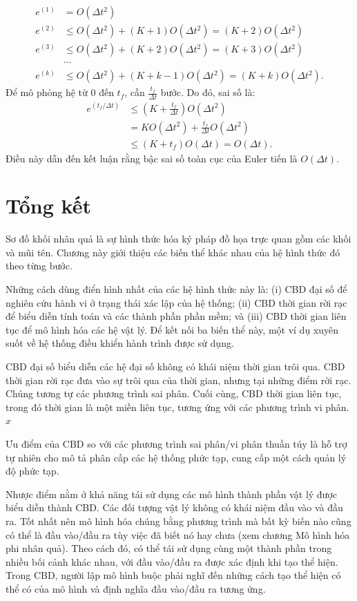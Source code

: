 \[\begin{aligned}
e^{(1)}&=O(\Delta t^2)\\
e^{(2)}&\le O(\Delta t^2)+(K+1)O(\Delta t^2)=(K+2)O(\Delta t^2)\\
e^{(3)}&\le O(\Delta t^2)+(K+2)O(\Delta t^2)=(K+3)O(\Delta t^2)\\
&\cdots\\
e^{(k)}&\le O(\Delta t^2)+(K+k-1)O(\Delta t^2)=(K+k)O(\Delta t^2).
\end{aligned}\]
Để mô phỏng hệ từ 0 đến $t_f$, cần $\frac{t_f}{\Delta t}$ bước. Do đó, sai số là:
\[\begin{aligned}
e^{(t_f/\Delta t)}&\le\left(K+\frac{t_f}{\Delta t}\right)O(\Delta t^2)\\
&=KO(\Delta t^2)+\frac{t_f}{\Delta t}O(\Delta t^2)\\
&\le(K+t_f)O(\Delta t)=O(\Delta t).
\end{aligned}\]
Điều này dẫn đến kết luận rằng bậc sai số toàn cục của Euler tiến là $O(\Delta t)$.
\section{Tổng kết}
Sơ đồ khối nhân quả là sự hình thức hóa ký pháp đồ họa trực quan gồm các khối và mũi tên. Chương này giới thiệu các biến thể khác nhau của hệ hình thức đó theo từng bước.

Những cách dùng điển hình nhất của các hệ hình thức này là: (i) CBD đại số để nghiên cứu hành vi ở trạng thái xác lập của hệ thống; (ii) CBD thời gian rời rạc để biểu diễn tính toán và các thành phần phần mềm; và (iii) CBD thời gian liên tục để mô hình hóa các hệ vật lý. Để kết nối ba biến thể này, một ví dụ xuyên suốt về hệ thống điều khiển hành trình được sử dụng.

CBD đại số biểu diễn các hệ đại số không có khái niệm thời gian trôi qua. CBD thời gian rời rạc đưa vào sự trôi qua của thời gian, nhưng tại những điểm rời rạc. Chúng tương tự các phương trình sai phân. Cuối cùng, CBD thời gian liên tục, trong đó thời gian là một miền liên tục, tương ứng với các phương trình vi phân. $x$

Ưu điểm của CBD so với các phương trình sai phân/vi phân thuần túy là hỗ trợ tự nhiên cho mô tả phân cấp các hệ thống phức tạp, cung cấp một cách quản lý độ phức tạp.

Nhược điểm nằm ở khả năng tái sử dụng các mô hình thành phần vật lý được biểu diễn thành CBD. Các đối tượng vật lý không có khái niệm đầu vào và đầu ra. Tốt nhất nên mô hình hóa chúng bằng phương trình mà bất kỳ biến nào cũng có thể là đầu vào/đầu ra tùy việc đã biết nó hay chưa (xem chương Mô hình hóa phi nhân quả). Theo cách đó, có thể tái sử dụng cùng một thành phần trong nhiều bối cảnh khác nhau, với đầu vào/đầu ra được xác định khi tạo thể hiện. Trong CBD, người lập mô hình buộc phải nghĩ đến những cách tạo thể hiện có thể có của mô hình và định nghĩa đầu vào/đầu ra tương ứng.


